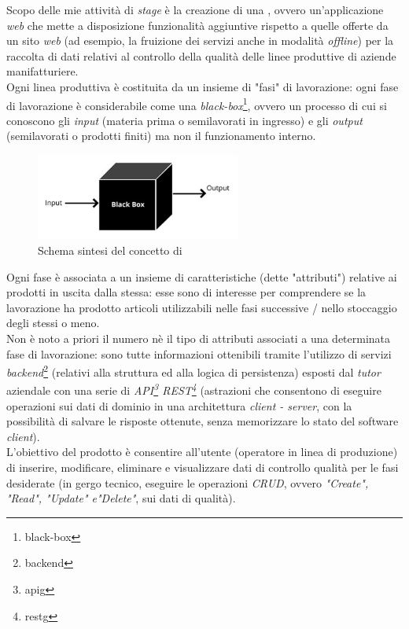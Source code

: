 Scopo delle mie attività di \textit{stage} è la creazione di una , ovvero un'applicazione \textit{web} che mette a disposizione funzionalità aggiuntive rispetto a quelle offerte da un sito \textit{web} (ad esempio, la fruizione dei servizi anche in modalità \textit{offline}) per la raccolta di dati relativi al controllo della qualità delle linee produttive di aziende manifatturiere. \\
Ogni linea produttiva è costituita da un insieme di "fasi" di lavorazione: ogni fase di lavorazione è considerabile come una \textit{black-box}\footnote{\gls{black-box}}, ovvero un processo di cui si conoscono gli \textit{input} (materia prima o semilavorati in ingresso)
e gli \textit{output} (semilavorati o prodotti finiti) ma non il funzionamento interno.
\begin{figure}[H]
    \centering
    \includegraphics[width=0.6\textwidth]{images/black-box.png}
    \caption[Schema sintesi del concetto di \textit{black-box}]{Schema sintesi del concetto di  \footnotemark}
\end{figure}
Ogni fase è associata a un insieme di caratteristiche (dette "attributi") relative ai prodotti in uscita dalla stessa: esse sono di interesse per comprendere se la lavorazione ha prodotto articoli utilizzabili nelle fasi successive / nello stoccaggio degli stessi o meno. \\
Non è noto a priori il numero nè il tipo di attributi associati a una determinata fase di lavorazione: sono tutte informazioni ottenibili tramite l'utilizzo di servizi \textit{backend}\footnote{\gls{backend}} (relativi alla struttura ed alla logica di persistenza) esposti dal \textit{tutor} aziendale con una
serie di \textit{API\footnote{\gls{apig}} REST\footnote{\gls{restg}}} (astrazioni che consentono di eseguire operazioni sui dati di dominio in una architettura \textit{client - server}, con la possibilità di salvare le risposte ottenute, senza memorizzare lo stato del software \textit{client}). \\
L'obiettivo del prodotto è consentire all'utente (operatore in linea di produzione) di inserire, modificare, eliminare e visualizzare dati di controllo qualità per le fasi desiderate (in gergo tecnico, eseguire le operazioni \textit{CRUD}, ovvero \textit{"Create", "Read", "Update" e"Delete"}, sui dati di qualità).

